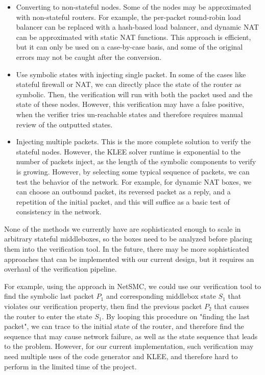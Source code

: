 \documentclass[letterpaper, 10 pt, conference]{ieeeconf}  %
\begin{document}
\begin{itemize}
  \item Converting to non-stateful nodes. 
  Some of the nodes may be approximated with non-stateful routers. 
  For example, the per-packet round-robin load balancer can be replaced with a hash-based load balancer, and dynamic NAT can be approximated with static NAT functions. 
  This approach is efficient, but it can only be used on a case-by-case basis, and some of the original errors may not be caught after the conversion. 
  \item Use symbolic states with injecting single packet. 
  In some of the cases like stateful firewall or NAT, we can directly place the state of the router as symbolic. 
  Then, the verification will run with both the packet used and the state of these nodes. 
  However, this verification may have a false positive, when the verifier tries un-reachable states and therefore requires manual review of the outputted states. 
  \item Injecting multiple packets. 
  This is the more complete solution to verify the stateful nodes. 
  However, the KLEE solver runtime is exponential to the number of packets inject, as the length of the symbolic components to verify is growing. 
  However, by selecting some typical sequence of packets, we can test the behavior of the network. 
  For example, for dynamic NAT boxes, we can choose an outbound packet, its reversed packet as a reply, and a repetition of the initial packet, and this will suffice as a basic test of consistency in the network. 
\end{itemize}

None of the methods we currently have are sophisticated enough to scale in arbitrary stateful middleboxes, so the boxes need to be analyzed before placing them into the verification tool. 
In the future, there may be more sophisticated approaches that can be implemented with our current design, but it requires an overhaul of the verification pipeline. 

For example, using the approach in NetSMC\cite{NetSMC}, we could use our verification tool to find the symbolic last packet $P_1$ and corresponding middlebox state $S_1$ that violates our verification property, 
then find the previous packet $P_2$ that causes the router to enter the state $S_1$. 
By looping this procedure on "finding the last packet", we can trace to the initial state of the router, and therefore find the sequence that may cause network failure, as well as the state sequence that leads to the problem.
However, for our current implementation, such verification may need multiple uses of the code generator and KLEE, and therefore hard to perform in the limited time of the project.
\end{document}
